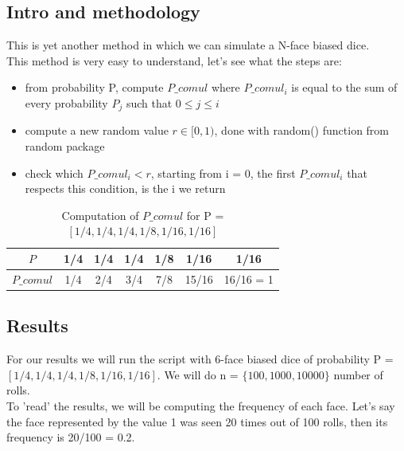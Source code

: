 \documentclass[a4paper]{article}
\begin{document}
\subsection*{Intro and methodology}
This is yet another method in which we can simulate a N-face biased dice.\\
This method is very easy to understand, let's see what the steps are:
\begin{itemize}
\item [(1)] from probability P, compute $P\_comul$ where $P\_comul_{i}$ is equal to the sum of every probability $P_{j}$ such that $0 \leq j \leq i$
\item [(2)] compute a new random value $r \in [0,1)$, done with random() function from random package
\item [(3)] check which $P\_comul_{i} < r$, starting from i = 0, the first $P\_comul_{i}$ that respects this condition, is the i we return
\end{itemize}

\begin{table}[H]
\begin{center}
\begin{tabular}{|c|c|c|c|c|c|c|}
\hline
$P$        & 1/4 & 1/4 & 1/4 & 1/8   & 1/16      & 1/16      \\ \hline
$P\_comul$ & 1/4 & 2/4 & 3/4 & 7/8 & 15/16 & 16/16 = 1 \\ \hline
\end{tabular}
\caption*{\label{BD} Computation of $P\_comul$ for P = $[ 1/4, 1/4, 1/4, 1/8, 1/16, 1/16]$ }
\end{center}
\end{table}

\subsection*{Results}
For our results we will run the script with 6-face biased dice of probability P = $[ 1/4, 1/4, 1/4, 1/8, 1/16, 1/16]$. We will do n = $\{ 100, 1000, 10000\}$ number of rolls.\\
To 'read' the results, we will be computing the frequency of each face. Let's say the face represented by the value 1 was seen 20 times out of 100 rolls, then its frequency is 20/100 = 0.2.
\end{document}
